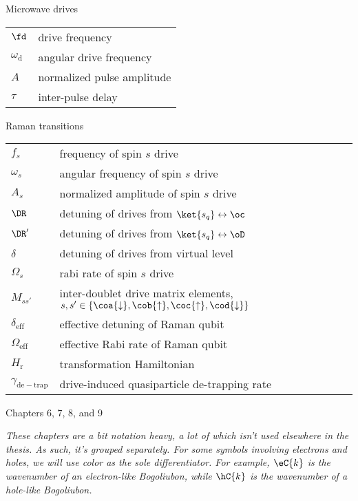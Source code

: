 {\Large\noindent Microwave drives}
\vspace{-.2cm}
\begin{longtable}{ m{5em} m{29em}}
$\fd$ & drive frequency \\
$\omega_\mathrm{d}$ & angular drive frequency \\
$A$ & normalized pulse amplitude \\
$\tau$ & inter-pulse delay \\
\end{longtable}
\vspace{.2cm}

{\Large\noindent Raman transitions}
\vspace{-.2cm}
\begin{longtable}{ m{5em} m{29em}}
$f_s$ & frequency of spin $s$ drive \\
$\omega_s$ & angular frequency of spin $s$ drive \\
$A_s$ & normalized amplitude of spin $s$ drive \\
$\DR$ & detuning of drives from $\ket{s_q}\leftrightarrow\oc$ \\
$\DR'$ & detuning of drives from $\ket{s_q}\leftrightarrow\oD$ \\
$\delta$ & detuning of drives from virtual level \\
$\Omega_s$ & rabi rate of  spin $s$ drive \\
$M_{s s'}$ & inter-doublet drive matrix elements, $s,s' \in \{ \coa{\downarrow}, \cob{\uparrow}, \coc{\uparrow}, \cod{\downarrow}\}$ \\ 
$\delta_\mathrm{eff}$ & effective detuning of Raman qubit \\
$\Omega_\mathrm{eff}$ & effective Rabi rate of Raman qubit \\
$H_\mathrm{r}$ & transformation Hamiltonian \\
$\gamma_\mathrm{de-trap}$ & drive-induced quasiparticle de-trapping rate \\
\end{longtable}
\vspace{.2cm}

\clearpage

{\huge \noindent Chapters 6, 7, 8, and 9}

\vspace{4mm}

\noindent \textit{These chapters are a bit notation heavy, a lot of which isn't used elsewhere in the thesis. As such, it's grouped separately. For some symbols involving electrons and holes, we will use color as the sole differentiator. 
For example, $\eC{k}$ is the wavenumber of an electron-like Bogoliubon, while $\hC{k}$ is the wavenumber of a hole-like Bogoliubon.}

